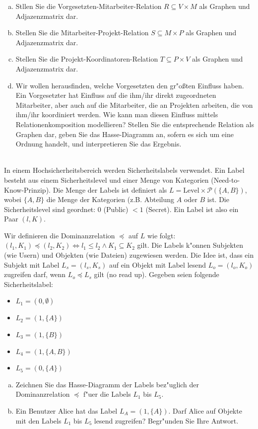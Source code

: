 \begin{enumerate}[(a)]
    \item Stllen Sie die Vorgesetzten-Mitarbeiter-Relation $R\subseteq V\times M$ als Graphen und Adjazenzmatrix dar.
    \item Stellen Sie die Mitarbeiter-Projekt-Relation $S\subseteq M\times P$ als Graphen und Adjazenzmatrix dar.
    \item Stellen Sie die Projekt-Koordinatoren-Relation $T\subseteq P\times V$ als Graphen und Adjazenzmatrix dar.
    \item Wir wollen herausfinden, welche Vorgesetzten den gr"o{\ss}ten Einfluss haben. Ein Vorgesetzter hat Einfluss auf die ihm/ihr direkt zugeordneten Mitarbeiter, aber auch auf die Mitarbeiter, die an Projekten arbeiten, die von ihm/ihr koordiniert werden. Wie kann man diesen Einfluss mittels Relationenkomposition modellieren? Stellen Sie die entsprechende Relation als Graphen dar, geben Sie das Hasse-Diagramm an, sofern es sich um eine Ordnung handelt, und interpretieren Sie das Ergebnis.
\end{enumerate}


\\
In einem Hochsicherheitsbereich werden Sicherheitslabels verwendet. Ein Label besteht aus einem Sicherheitslevel und einer Menge von Kategorien (Need-to-Know-Prinzip). 
Die Menge der Labels ist definiert als $L=\text{Level}\times\mathcal{P}(\{A,B\})$, wobei $\{A,B\}$ die Menge der Kategorien (z.B. Abteilung $A$ oder $B$ ist.
Die Sicherheitslevel sind geordnet: $0$ (Public) $< 1$ (Secret).
Ein Label ist also ein Paar $(l,K)$. 

Wir definieren die Dominanzrelation $\preceq$ auf $L$ wie folgt: $(l_1,K_1) \preceq (l_2,K_2)\Leftrightarrow l_1 \leq l_2 \wedge K_1 \subseteq K_2$ gilt.
Die Labels k"onnen Subjekten (wie Usern) und Objekten (wie Dateien) zugewiesen werden.
Die Idee ist, dass ein Subjekt mit Label $L_s=(l_s,K_s)$ auf ein Objekt mit Label lesend $L_o=(l_o,K_o)$ zugreifen darf, wenn $L_o \preceq L_s$ gilt (no read up).
Gegeben seien folgende Sicherheitslabel:
\begin{itemize}
    \item $L_1 = (0,\emptyset)$
    \item $L_2 = (1,\{A\})$
    \item $L_3 = (1,\{B\})$
    \item $L_4 = (1,\{A,B\})$
    \item $L_5 = (0,\{A\})$
   
\end{itemize}
\begin{enumerate}[(a)]
    \item Zeichnen Sie das Hasse-Diagramm der Labels bez"uglich der Dominanzrelation $\preceq$ f"uer die Labels $L_1$ bis $L_5$.
    \item Ein Benutzer Alice hat das Label $L_A = (1,\{A\})$. Darf Alice auf Objekte mit den Labels $L_1$ bis $L_5$ lesend zugreifen? Begr"unden Sie Ihre Antwort.
\end{enumerate}

